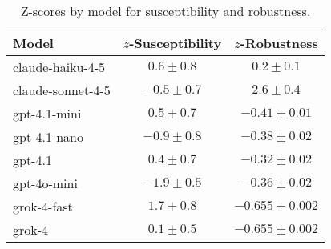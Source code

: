 \begin{table}[t]
  \centering
  \caption{Z-scores by model for susceptibility and robustness.}
  \label{tab:zscores_by_model}
  \begin{tabular}{lcc}
    \toprule
    Model & $z$-Susceptibility & $z$-Robustness \\
    \midrule
    claude-haiku-4-5 & $0.6\pm 0.8$ & $0.2\pm 0.1$ \\
    claude-sonnet-4-5 & $-0.5\pm 0.7$ & $2.6\pm 0.4$ \\
    gpt-4.1-mini & $0.5\pm 0.7$ & $-0.41\pm 0.01$ \\
    gpt-4.1-nano & $-0.9\pm 0.8$ & $-0.38\pm 0.02$ \\
    gpt-4.1 & $0.4\pm 0.7$ & $-0.32\pm 0.02$ \\
    gpt-4o-mini & $-1.9\pm 0.5$ & $-0.36\pm 0.02$ \\
    grok-4-fast & $1.7\pm 0.8$ & $-0.655\pm 0.002$ \\
    grok-4 & $0.1\pm 0.5$ & $-0.655\pm 0.002$ \\
    \bottomrule
  \end{tabular}
\end{table}

